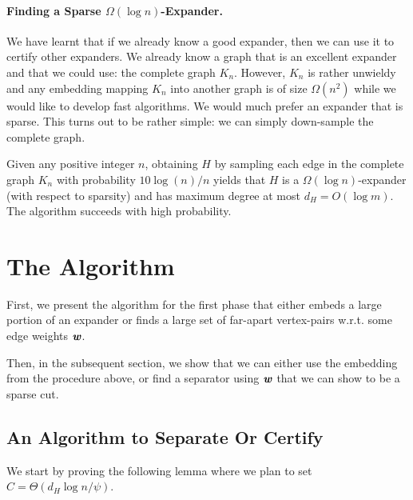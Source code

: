 \paragraph{Finding a Sparse $\Omega(\log n)$-Expander.} We have learnt that if we already know a good expander, then we can use it to certify other expanders. We already know a graph that is an excellent expander and that we could use: the complete graph $K_n$. However, $K_n$ is rather unwieldy and any embedding mapping $K_n$ into another graph is of size $\Omega(n^2)$ while we would like to develop fast algorithms. We would much prefer an expander that is sparse. This turns out to be rather simple: we can simply down-sample the complete graph. 

\begin{lemma}\label{lma:sampleDownCompleteGraph}
Given any positive integer $n$, obtaining $H$ by sampling each edge in the complete graph $K_n$ with probability $10 \log(n)/n$ yields that $H$ is a $\Omega(\log n)$-expander (with respect to sparsity) and has maximum degree at most $d_H = O(\log m)$. The algorithm succeeds with high probability.
\end{lemma}

\section{The Algorithm}

First, we present the algorithm for the first phase that either embeds a large portion of an expander or finds a large set of far-apart vertex-pairs w.r.t. some edge weights $\boldsymbol{\mathit{w}}$.

Then, in the subsequent section, we show that we can either use the embedding from the procedure above, or find a separator using $\boldsymbol{\mathit{w}}$ that we can show to be a sparse cut. 

\subsection{An Algorithm to Separate Or Certify}
\label{sec:seporcert}

We start by proving the following lemma where we plan to set $C = \Theta(d_H \log n/\psi)$. 

